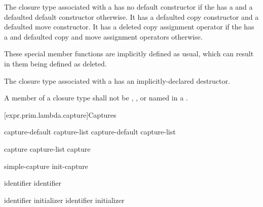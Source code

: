 \pnum
The closure type associated with a  has no
default constructor
if the  has a 
and a defaulted default constructor otherwise.
It has a defaulted copy constructor and a defaulted move constructor.
It has a deleted copy assignment operator if the 
has a  and defaulted copy and move assignment
operators otherwise.
\begin{note}
These special member functions are implicitly defined as
usual, which can result in them being defined as deleted.
\end{note}

\pnum
The closure type associated with a  has an
implicitly-declared destructor.

\pnum
A member of a closure type shall not be
,
, or
named in a .

[expr.prim.lambda.capture]{Captures}%

\begin{bnf}
\br
    capture-default\br
    capture-list\br
    capture-default \terminal{,} capture-list
\end{bnf}

\begin{bnf}
\br
    \terminal{\&}\br
    \terminal{=}
\end{bnf}

\begin{bnf}
\br
    capture\br
    capture-list \terminal{,} capture
\end{bnf}

\begin{bnf}
\br
    simple-capture\br
    init-capture
\end{bnf}

\begin{bnf}
\br
    identifier \br
    \terminal{\&} identifier \br
    \br
    \terminal{*} 
\end{bnf}

\begin{bnf}
\br
     identifier initializer\br
    \terminal{\&}  identifier initializer
\end{bnf}

